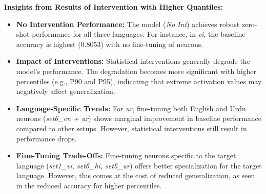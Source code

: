 \textbf{Insights from Results of Intervention with Higher Quantiles:}
\begin{itemize}
	\item \textbf{No Intervention Performance:} The model (\textit{No Int}) achieves robust zero-shot performance for all three languages. For instance, in \textit{vi}, the baseline accuracy is highest (0.8053) with no fine-tuning of neurons.
	\item \textbf{Impact of Interventions:} Statistical interventions generally degrade the model's performance. The degradation becomes more significant with higher percentiles (e.g., P90 and P95), indicating that extreme activation values may negatively affect generalization.
	\item \textbf{Language-Specific Trends:} For \textit{ur}, fine-tuning both English and Urdu neurons (\textit{set6\_en + ur}) shows marginal improvement in baseline performance compared to other setups. However, statistical interventions still result in performance drops.
	\item \textbf{Fine-Tuning Trade-Offs:} Fine-tuning neurons specific to the target language (\textit{set1\_vi, set6\_hi, set6\_ur}) offers better specialization for the target language. However, this comes at the cost of reduced generalization, as seen in the reduced accuracy for higher percentiles.
\end{itemize}

